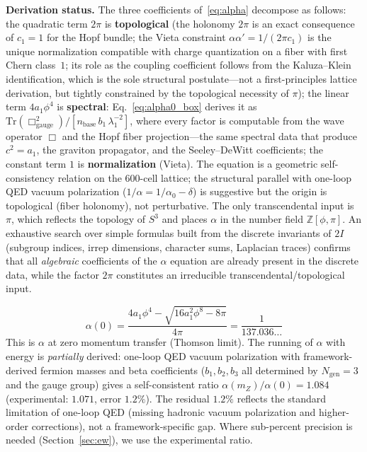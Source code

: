 \documentclass[12pt,a4paper]{article}
\theoremstyle{definition}
\begin{document}
\textbf{Derivation status.}  The three coefficients of~\eqref{eq:alpha} decompose as follows: the quadratic term $2\pi$ is \textbf{topological} (the holonomy $2\pi$ is an exact consequence of $c_1 = 1$ for the Hopf bundle; the Vieta constraint $\alpha\alpha' = 1/(2\pi c_1)$ is the unique normalization compatible with charge quantization on a fiber with first Chern class~$1$; its role as the coupling coefficient follows from the Kaluza--Klein identification, which is the sole structural postulate---not a first-principles lattice derivation, but tightly constrained by the topological necessity of $\pi$); the linear term $4a_1\phi^4$ is \textbf{spectral}: Eq.~\eqref{eq:alpha0_box} derives it as $\mathrm{Tr}(\Box_{\mathrm{gauge}}^2)/[n_{\mathrm{base}}\,b_1\,\lambda_1^{-2}]$, where every factor is computable from the wave operator $\Box$ and the Hopf fiber projection---the same spectral data that produce $c^2 = a_1$, the graviton propagator, and the Seeley--DeWitt coefficients; the constant term $1$ is \textbf{normalization} (Vieta).  The equation is a geometric self-consistency relation on the 600-cell lattice; the structural parallel with one-loop QED vacuum polarization ($1/\alpha = 1/\alpha_0 - \delta$) is suggestive but the origin is topological (fiber holonomy), not perturbative.  The only transcendental input is $\pi$, which reflects the topology of $S^3$ and places $\alpha$ in the number field $\mathbb{Z}[\phi, \pi]$.  An exhaustive search over simple formulas built from the discrete invariants of $2I$ (subgroup indices, irrep dimensions, character sums, Laplacian traces) confirms that all \emph{algebraic} coefficients of the $\alpha$ equation are already present in the discrete data, while the factor $2\pi$ constitutes an irreducible transcendental/topological input.

\begin{equation}
\alpha(0) = \frac{4a_1\phi^4 - \sqrt{16a_1^2\phi^8 - 8\pi}}{4\pi} = \frac{1}{137.036\ldots}
\end{equation}
This is $\alpha$ at zero momentum transfer (Thomson limit).  The running of $\alpha$ with energy is \emph{partially} derived: one-loop QED vacuum polarization with framework-derived fermion masses and beta coefficients ($b_1, b_2, b_3$ all determined by $N_{\text{gen}} = 3$ and the gauge group) gives a self-consistent ratio $\alpha(m_Z)/\alpha(0) = 1.084$ (experimental: $1.071$, error $1.2\%$).  The residual $1.2\%$ reflects the standard limitation of one-loop QED (missing hadronic vacuum polarization and higher-order corrections), not a framework-specific gap.  Where sub-percent precision is needed (Section~\ref{sec:ew}), we use the experimental ratio.
\end{document}
